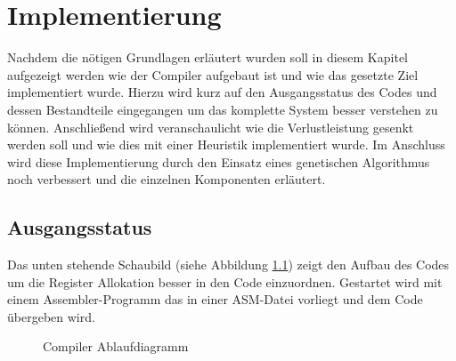 \chapter{Implementierung}
\label{chap:Implementierung}
Nachdem die nötigen Grundlagen erläutert wurden soll in diesem Kapitel aufgezeigt werden wie der Compiler aufgebaut ist und wie das gesetzte Ziel implementiert wurde. Hierzu wird kurz auf den Ausgangsstatus des Codes und dessen Bestandteile eingegangen um das komplette System besser verstehen zu können. Anschließend wird veranschaulicht wie die Verlustleistung gesenkt werden soll und wie dies mit einer Heuristik implementiert wurde. Im Anschluss wird diese Implementierung durch den Einsatz eines genetischen Algorithmus noch verbessert und die einzelnen Komponenten erläutert.
\newpage
\section{Ausgangsstatus}
 Das unten stehende Schaubild (siehe Abbildung \ref{fig:flow_compiler}) zeigt den Aufbau des Codes um die Register Allokation besser in den Code einzuordnen. Gestartet wird mit einem Assembler-Programm das in einer ASM-Datei vorliegt und dem Code übergeben wird.
 
 
%			

\begin{scriptsize}
	\begin{figure}[htbp] 
		\centering
		
		\caption{Compiler Ablaufdiagramm}
		\label{fig:flow_compiler}
	\end{figure}
\end{scriptsize}


